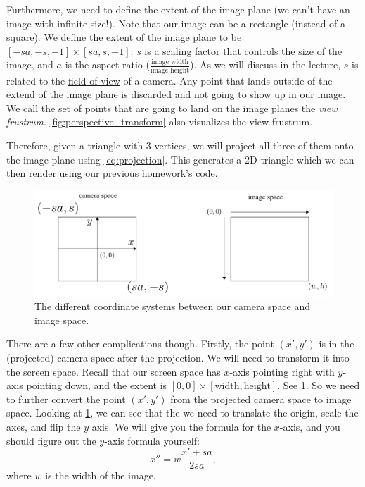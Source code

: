 Furthermore, we need to define the extent of the image plane (we can't have an image with infinite size!). Note that our image can be a rectangle (instead of a square). We define the extent of the image plane to be $[-sa, -s, -1] \times [sa, s, -1]$: $s$ is a scaling factor that controls the size of the image, and $a$ is the aspect ratio ($\frac{\text{image width}}{\text{image height}}$). As we will discuss in the lecture, $s$ is related to the \href{https://en.wikipedia.org/wiki/Field_of_view}{field of view} of a camera. Any point that lands outside of the extend of the image plane is discarded and not going to show up in our image. We call the set of points that are going to land on the image planes the \emph{view frustrum}. \cref{fig:perspective_transform} also visualizes the view frustrum.

Therefore, given a triangle with 3 vertices, we will project all three of them onto the image plane using \cref{eq:projection}. This generates a 2D triangle which we can then render using our previous homework's code.

\begin{figure}[h]
    \centering
    \includegraphics[width=0.9\linewidth]{imgs/camera_vs_image.pdf}
    \caption{The different coordinate systems between our camera space and image space.}
    \label{fig:camera_vs_image}
\end{figure}

There are a few other complications though. Firstly, the point $(x', y')$ is in the (projected) camera space after the projection. We will need to transform it into the screen space. Recall that our screen space has $x$-axis pointing right with $y$-axis pointing down, and the extent is $[0, 0] \times [\text{width}, \text{height}]$. See \cref{fig:camera_vs_image}. So we need to further convert the point $(x', y')$ from the projected camera space to image space. Looking at \cref{fig:camera_vs_image}, we can see that the we need to translate the origin, scale the axes, and flip the $y$ axis. We will give you the formula for the $x$-axis, and you should figure out the $y$-axis formula yourself:
\begin{equation}
x'' = w\frac{x'+sa}{2sa},
\label{eq:camera_to_screen}
\end{equation}
where $w$ is the width of the image.

